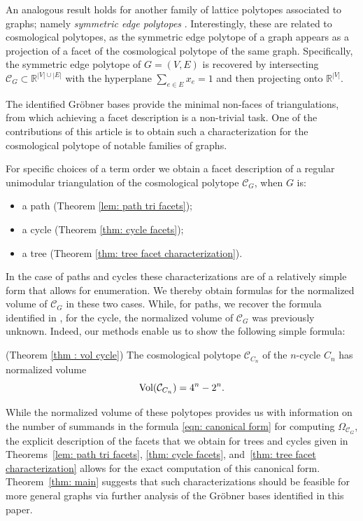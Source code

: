 An analogous result holds for another family of lattice polytopes associated to graphs; namely \emph{symmetric edge polytopes} \cite{HJM,FirstSEP}. Interestingly, these are related to cosmological polytopes, as the symmetric edge polytope of a graph appears as a projection of a facet of the cosmological polytope of the same graph.
Specifically, the symmetric edge polytope of $G=(V,E)$ is recovered by intersecting $\mathcal{C}_G\subset\mathbb{R}^{|V|\cup |E|}$ with the hyperplane $\sum_{e\in E}x_e =1$ and then projecting onto $\mathbb{R}^{|V|}$.

The identified Gr\"obner bases provide the minimal non-faces of triangulations, from which achieving a facet description is a non-trivial task. One of the contributions of this article is to obtain such a characterization for the cosmological polytope of notable families of graphs.
\begin{thmx}
    For specific choices of a term order we obtain a facet description of a regular unimodular triangulation of the cosmological polytope $\mathcal{C}_G$, when $G$ is:
\begin{itemize}
    \item[-] a path  (Theorem \ref{lem: path tri facets});
    \item[-] a cycle (Theorem \ref{thm: cycle facets});
    \item[-] a tree (Theorem \ref{thm: tree facet characterization}).
\end{itemize}
\end{thmx}
In the case of paths and cycles these characterizations are of a relatively simple form that allows for enumeration. 
We thereby obtain formulas for the normalized volume of $\mathcal{C}_G$ in these two  cases. While, for paths, we recover the formula identified in \cite{kuhne2022faces}, for the cycle, the normalized volume of $\mathcal{C}_G$ was previously unknown. Indeed, our methods enable us to show the following simple formula:
\begin{thmx} (Theorem \ref{thm : vol cycle})
    The cosmological polytope $\mathcal{C}_{C_n}$ of the $n$-cycle $C_n$ has normalized volume
    \[
        \textnormal{Vol}(\mathcal{C}_{C_n})=4^n-2^n.
    \]
\end{thmx}
While the normalized volume of these polytopes provides us with information on the number of summands in the formula \eqref{eqn: canonical form} for computing $\Omega_{\mathcal{C}_G}$, the explicit description of the facets that we obtain for trees and cycles given in Theorems~\ref{lem: path tri facets}, \ref{thm: cycle facets}, and~\ref{thm: tree facet characterization} allows for the exact computation of this canonical form.  
Theorem~\ref{thm: main} suggests that such characterizations should be feasible for more general graphs via further analysis of the Gr\"obner bases identified in this paper. 

